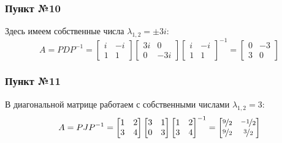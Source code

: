 \documentclass[a3paper,14pt]{extarticle}
\begin{document}
\subsubsection*{Пункт №10}
Здесь имеем собственные числа $\lambda_{1,2}= \pm3i$:
$$A = PDP^{-1} = \begin{bmatrix}
    i & -i \\ 1 & 1
\end{bmatrix}\begin{bmatrix}
    3i & 0 \\ 0 & -3i
\end{bmatrix}\begin{bmatrix}
    i & -i \\ 1 & 1
\end{bmatrix}^{-1} = \begin{bmatrix}
    0 & -3 \\ 3 & 0
\end{bmatrix}$$
\subsubsection*{Пункт №11}
В диагональной матрице работаем с собственными числами $\lambda_{1,2}= 3$:
$$A = PJP^{-1} = \begin{bmatrix}
    1 & 2 \\ 3 & 4
\end{bmatrix}\begin{bmatrix}
    3 & 1 \\ 0 & 3
\end{bmatrix}\begin{bmatrix}
    1 & 2 \\ 3 & 4
\end{bmatrix}^{-1} = \begin{bmatrix}
    \nicefrac{9}{2} & \nicefrac{-1}{2} \\
    \nicefrac{9}{2} & \nicefrac{3}{2}
\end{bmatrix}$$
\end{document}
